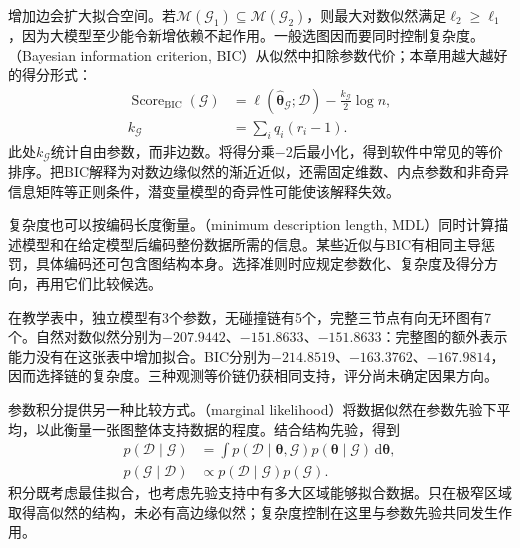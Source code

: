 增加边会扩大拟合空间。若$\mathcal{M}(\mathcal{G}_1)\subseteq\mathcal{M}(\mathcal{G}_2)$，则最大对数似然满足$\ell_2\geq\ell_1$，因为大模型至少能令新增依赖不起作用。一般选图因而要同时控制复杂度。（Bayesian information criterion, BIC）从似然中扣除参数代价；本章用越大越好的得分形式：
\begin{equation}
  \begin{aligned}
    \operatorname{Score}_{\mathrm{BIC}}(\mathcal{G})
      &=\ell(\widehat{\bm{\theta}}_{\mathcal{G}};\mathcal{D})
        -\frac{k_{\mathcal{G}}}{2}\log n,\\
    k_{\mathcal{G}}&=\sum_iq_i(r_i-1).
  \end{aligned}
  \label{eq:pgm-structure-learning-bic}
\end{equation}
此处$k_{\mathcal{G}}$统计自由参数，而非边数。将得分乘$-2$后最小化，得到软件中常见的等价排序。把BIC解释为对数边缘似然的渐近近似，还需固定维数、内点参数和非奇异信息矩阵等正则条件，潜变量模型的奇异性可能使该解释失效。

复杂度也可以按编码长度衡量。（minimum description length, MDL）同时计算描述模型和在给定模型后编码整份数据所需的信息。某些近似与BIC有相同主导惩罚，具体编码还可包含图结构本身。选择准则时应规定参数化、复杂度及得分方向，再用它们比较候选。

在教学表中，独立模型有3个参数，无碰撞链有5个，完整三节点有向无环图有7个。自然对数似然分别为$-207.9442$、$-151.8633$、$-151.8633$：完整图的额外表示能力没有在这张表中增加拟合。BIC分别为$-214.8519$、$-163.3762$、$-167.9814$，因而选择链的复杂度。三种观测等价链仍获相同支持，评分尚未确定因果方向。

参数积分提供另一种比较方式。（marginal likelihood）将数据似然在参数先验下平均，以此衡量一张图整体支持数据的程度。结合结构先验，得到
\begin{equation}
  \begin{aligned}
    p(\mathcal{D}\mid\mathcal{G})
      &=\int p(\mathcal{D}\mid\bm{\theta},\mathcal{G})
              p(\bm{\theta}\mid\mathcal{G})\,\mathrm{d}\bm{\theta},\\
    p(\mathcal{G}\mid\mathcal{D})
      &\propto p(\mathcal{D}\mid\mathcal{G})p(\mathcal{G}).
  \end{aligned}
  \label{eq:pgm-structure-learning-posterior}
\end{equation}
积分既考虑最佳拟合，也考虑先验支持中有多大区域能够拟合数据。只在极窄区域取得高似然的结构，未必有高边缘似然；复杂度控制在这里与参数先验共同发生作用。

